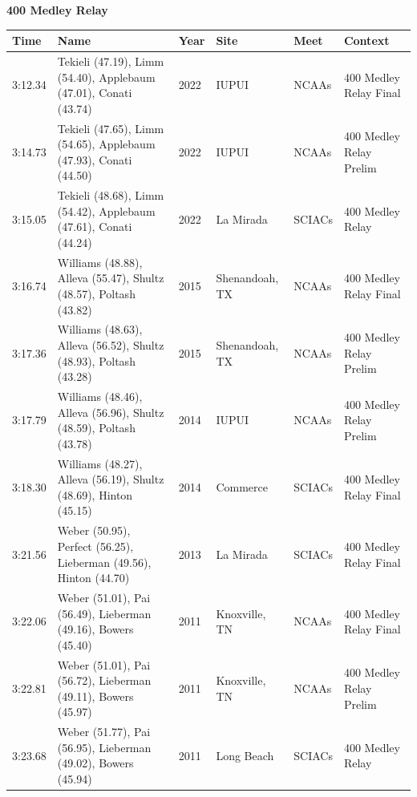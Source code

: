 \noindent\begin{minipage}[t]{0.98\textwidth}
\centering
\textbf{\textcolor{teamprimary}{400 Medley Relay}}\par
\vspace{0.5em}
\centering
\small
\renewcommand{\arraystretch}{1.0}
\setlength{\tabcolsep}{4pt}
\begin{tabular}{@{}p{2.0cm}p{3.2cm}p{1.2cm}p{2.0cm}p{2.0cm}p{2.5cm}@{}}
\toprule
\textbf{Time} & \textbf{Name} & \textbf{Year} & \textbf{Site} & \textbf{Meet} & \textbf{Context} \\
\midrule
3:12.34 & Tekieli (47.19), Limm (54.40), Applebaum (47.01), Conati (43.74) & 2022 & IUPUI & NCAAs & 400 Medley Relay Final \\
3:14.73 & Tekieli (47.65), Limm (54.65), Applebaum (47.93), Conati (44.50) & 2022 & IUPUI & NCAAs & 400 Medley Relay Prelim \\
3:15.05 & Tekieli (48.68), Limm (54.42), Applebaum (47.61), Conati (44.24) & 2022 & La Mirada & SCIACs & 400 Medley Relay \\
3:16.74 & Williams (48.88), Alleva (55.47), Shultz (48.57), Poltash (43.82) & 2015 & Shenandoah, TX & NCAAs & 400 Medley Relay Final \\
3:17.36 & Williams (48.63), Alleva (56.52), Shultz (48.93), Poltash (43.28) & 2015 & Shenandoah, TX & NCAAs & 400 Medley Relay Prelim \\
3:17.79 & Williams (48.46), Alleva (56.96), Shultz (48.59), Poltash (43.78) & 2014 & IUPUI & NCAAs & 400 Medley Relay Prelim \\
3:18.30 & Williams (48.27), Alleva (56.19), Shultz (48.69), Hinton (45.15) & 2014 & Commerce & SCIACs & 400 Medley Relay Final \\
3:21.56 & Weber (50.95), Perfect (56.25), Lieberman (49.56), Hinton (44.70) & 2013 & La Mirada & SCIACs & 400 Medley Relay Final \\
3:22.06 & Weber (51.01), Pai (56.49), Lieberman (49.16), Bowers (45.40) & 2011 & Knoxville, TN & NCAAs & 400 Medley Relay Final \\
3:22.81 & Weber (51.01), Pai (56.72), Lieberman (49.11), Bowers (45.97) & 2011 & Knoxville, TN & NCAAs & 400 Medley Relay Prelim \\
3:23.68 & Weber (51.77), Pai (56.95), Lieberman (49.02), Bowers (45.94) & 2011 & Long Beach & SCIACs & 400 Medley Relay \\
\bottomrule
\end{tabular}
\end{minipage}
\vspace{-0.5em}
\clearpage
